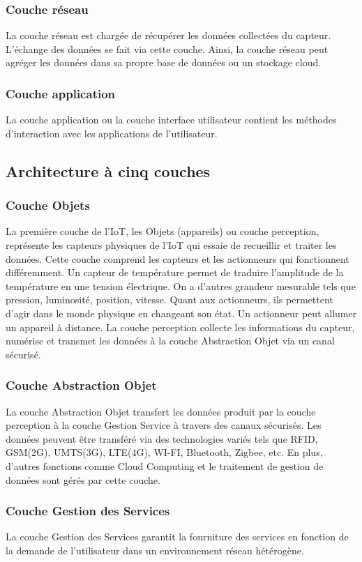 	\subsubsection{Couche réseau}
La couche réseau est chargée de récupérer les données collectées du capteur. L’échange des données se fait via cette couche. Ainsi, la couche réseau peut agréger les données dans sa propre base de données ou un stockage cloud.
	\subsubsection{Couche application}
La couche application ou la couche interface utilisateur contient les méthodes d’interaction avec les applications de l’utilisateur.
	\subsection{Architecture à cinq couches}
	\subsubsection{Couche Objets}
La première couche de l’IoT, les Objets (appareils) ou couche perception, représente les capteurs physiques de l’IoT qui essaie de recueillir et traiter les données. Cette couche comprend les capteurs et les actionneurs qui fonctionnent dif{\kern0pt}féremment. Un capteur de température permet de traduire l’amplitude de la température en une tension électrique. On a d’autres grandeur mesurable tels que pression, luminosité, position, vitesse. Quant aux actionneurs, ils permettent d’agir dans le monde physique en changeant son état. Un actionneur peut allumer un appareil à distance. La couche perception collecte les informations du capteur, numérise et transmet les données à la couche Abstraction Objet via un canal sécurisé.
	\subsubsection{Couche Abstraction Objet}
La couche Abstraction Objet transfert les données produit par la couche perception à la couche Gestion Service à travers des canaux sécurisés. Les données peuvent être transféré via des technologies variés tels que RFID, GSM(2G), UMTS(3G), LTE(4G), WI-FI, Bluetooth, Zigbee, etc. En plus, d’autres fonctions comme Cloud Computing et le traitement de gestion de données sont gérés par cette couche.
	\subsubsection{Couche Gestion des Services}
La couche Gestion des Services garantit la fourniture des services en fonction de la demande de l'utilisateur dans un environnement réseau hétérogène.
